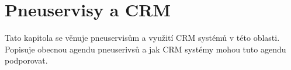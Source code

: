 \chapter{Pneuservisy a CRM}
Tato kapitola se věnuje pneuservisům a využití CRM systémů v této oblasti. Popisuje obecnou agendu pneuserivsů a jak CRM systémy mohou tuto agendu podporovat.


